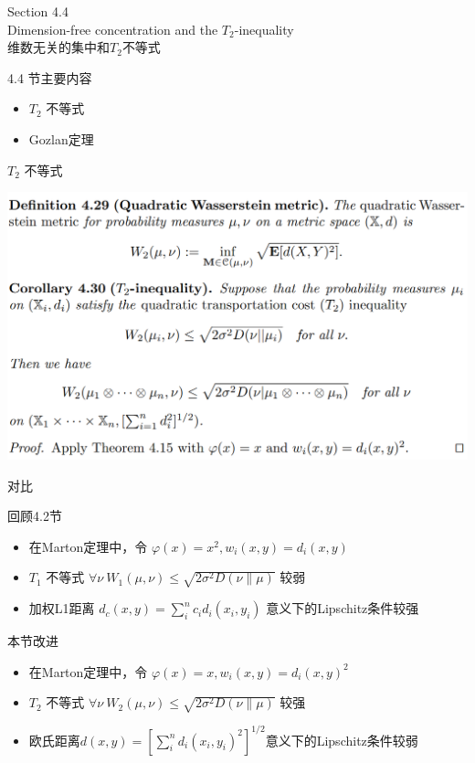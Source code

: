 \documentclass{beamer}
\begin{document}
\begin{frame}
\begin{center}
\Large Section 4.4 \\ Dimension-free concentration and the \texorpdfstring{$T_2$}{2}-inequality \\ 维数无关的集中和\texorpdfstring{$T_2$}{2}不等式
\end{center}
\end{frame}

\begin{frame}{4.4 节主要内容}
\begin{itemize}
    \item $T_2$ 不等式
    \item Gozlan定理
\end{itemize}
\end{frame}

\begin{frame}{$T_2$ 不等式}

\begin{center}
    \includegraphics[width=1.0\textwidth, frame]{figures/4-29-def-4-30-corol.png}
\end{center}

\end{frame}

\begin{frame}{对比}

回顾4.2节

\begin{itemize}
    \item 在Marton定理中，令 $\varphi(x)=x^2, w_i(x,y) = d_i(x,y)$
    \item $T_1$ 不等式 $\forall \nu\ W_1(\mu, \nu) \le \sqrt{2\sigma^{2}D(\nu\|\mu)}$ 较弱
    \item 加权L1距离 $d_c(x, y) = \sum_i^n c_i d_i(x_i, y_i)$ 意义下的Lipschitz条件较强
\end{itemize}

本节改进

\begin{itemize}
    \item 在Marton定理中，令 $\varphi(x)=x, w_i(x,y) = d_i(x,y)^2$
    \item $T_2$ 不等式 $\forall \nu\ W_2(\mu, \nu) \le \sqrt{2\sigma^{2}D(\nu\|\mu)}$ 较强
    \item 欧氏距离$d(x, y) = \left[\sum_i^n d_i(x_i, y_i)^2\right]^{1/2}$意义下的Lipschitz条件较弱
\end{itemize}

\end{frame}
\end{document}
